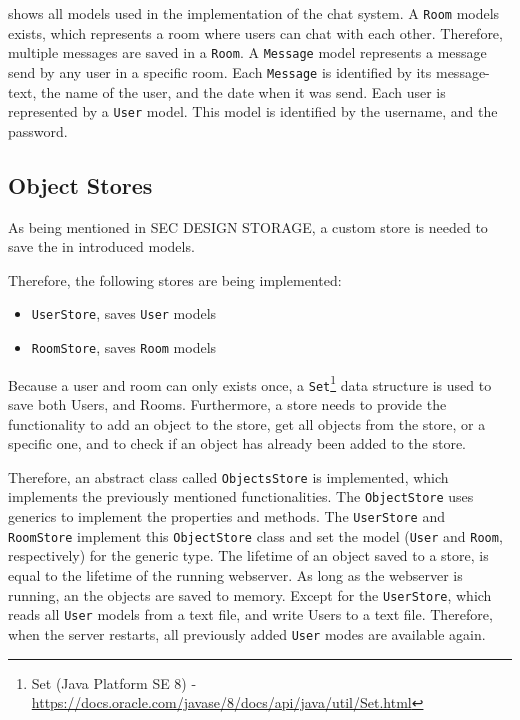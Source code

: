  shows all models used in the implementation of the chat system.
A \texttt{Room} models exists, which represents a room where users can chat with each other. Therefore, multiple messages are saved in a \texttt{Room}. A \texttt{Message} model represents a message send by any user in a specific room. Each \texttt{Message} is identified by its message-text, the name of the user, and the date when it was send.
Each user is represented by a \texttt{User} model. This model is identified by the username, and the password.


\subsection{Object Stores}\label{subsec:03_impl_objstores}
As being mentioned in SEC DESIGN STORAGE, a custom store is needed to save the in  introduced models.

Therefore, the following stores are being implemented:
\begin{itemize}
\item \texttt{UserStore}, saves \texttt{User} models
\item \texttt{RoomStore}, saves \texttt{Room} models
\end{itemize}
Because a user and room can only exists once, a \texttt{Set}\footnote{Set (Java Platform SE 8) - \url{https://docs.oracle.com/javase/8/docs/api/java/util/Set.html}} data structure is used to save both Users, and Rooms. Furthermore, a store needs to provide the functionality to add an object to the store, get all objects from the store, or a specific one, and to check if an object has already been added to the store.


Therefore, an abstract class called \texttt{ObjectsStore} is implemented, which implements the previously mentioned functionalities.
The \texttt{ObjectStore} uses generics to implement the properties and methods. The \texttt{UserStore} and \texttt{RoomStore} implement this \texttt{ObjectStore} class and set the model (\texttt{User} and \texttt{Room}, respectively) for the generic type.
The lifetime of an object saved to a store, is equal to the lifetime of the running webserver. As long as the webserver is running, an the objects are saved to memory.
Except for the \texttt{UserStore}, which reads all \texttt{User} models from a text file, and write Users to a text file. Therefore, when the server restarts, all previously added \texttt{User} modes are available again.


